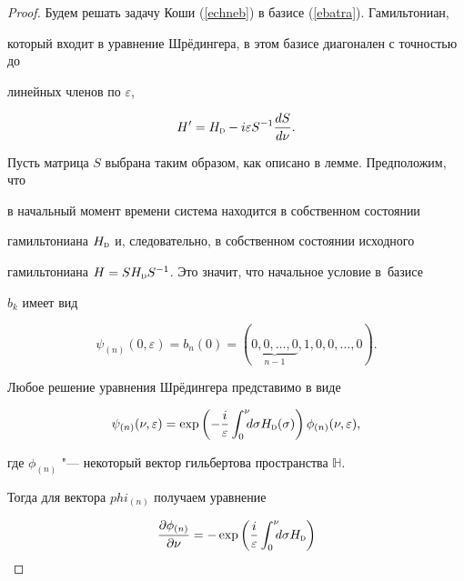 \begin{proof} Будем решать задачу Коши (\ref{echneb}) в базисе (\ref{ebatra}). Гамильтониан,

который входит в уравнение Шрёдингера, в этом базисе диагонален с точностью до

линейных членов по $\varepsilon $,

\begin{equation}                                                  \label{ehaede}

  H^\prime{}=H_{\textsc{d}}-i\varepsilon S^{-1}\frac{dS}{d\nu}.

\end{equation}

Пусть матрица $S$ выбрана таким образом, как описано в лемме. Предположим, что

в начальный момент времени система находится в собственном состоянии

гамильтониана $H_{\textsc{d}}$ и, следовательно, в собственном состоянии исходного

гамильтониана $H=SH_{\textsc{d}} S^{-1}$. Это значит, что начальное условие в~базисе

$b_k$ имеет вид

\begin{equation*}

  \psi_{(n)}(0,\varepsilon )=b_n(0)=(\underbrace{0, 0, \dotsc, 0}_{n-1}, 1, 0, 0, \dotsc, 0).

\end{equation*}

Любое решение уравнения Шрёдингера представимо в виде

\begin{equation}                                                  \label{esodia}

  \psi_{(n)}(\nu,\varepsilon )

  =\exp\left(-\frac i\varepsilon \int_0^\nu \!\!\! d\sigma H_{\textsc{d}}(\sigma )\right)\phi_{(n)}(\nu,\varepsilon ),

\end{equation}

где $\phi_{(n)}$ "--- некоторый вектор гильбертова пространства $\mathbb H$. 

Тогда для вектора $phi_{(n)}$ получаем уравнение

\begin{equation*}

  \frac{\partial  \phi_{(n)}}{\partial  \nu}=

  -\exp\left(\frac i\varepsilon \int_0^\nu \!\!\! d\sigma H_{\textsc{d}}\right)


\end{equation*}
\end{proof}
